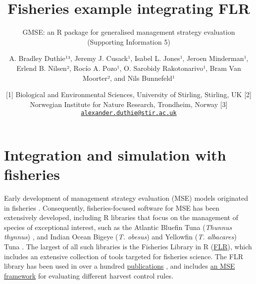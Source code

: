 \documentclass[]{article}
\title{Fisheries example integrating FLR}
\subtitle{GMSE: an R package for generalised management strategy evaluation
(Supporting Information 5)}
\author{A. Bradley Duthie¹³, Jeremy J. Cusack¹, Isabel L. Jones¹, Jeroen
Minderman¹, Erlend B. Nilsen², Rocío A. Pozo¹, O. Sarobidy
Rakotonarivo¹, Bram Van Moorter², and Nils Bunnefeld¹}
\date{{[}1{]} Biological and Environmental Sciences, University of Stirling,
Stirling, UK {[}2{]} Norwegian Institute for Nature Research, Trondheim,
Norway {[}3{]}
\href{mailto:alexander.duthie@stir.ac.uk}{\nolinkurl{alexander.duthie@stir.ac.uk}}}
\begin{document}
\maketitle

\section{Integration and simulation with
fisheries}\label{integration-and-simulation-with-fisheries}

Early development of management strategy evaluation (MSE) models
originated in fisheries \citep{Polacheck1999, Smith1999, Sainsbury2000}.
Consequently, fisheries-focused software for MSE has been extensively
developed, including R libraries that focus on the management of species
of exceptional interest, such as the Atlantic Bluefin Tuna
(\emph{Thunnus thynnus})
\citep[\href{https://github.com/ICCAT/abft-mse/tree/master/R_package/ABTMSE}{ABFTMSE};][]{Carruthers2018, Carruthers2018a},
and Indian Ocean Bigeye (\emph{T. obesus}) and Yellowfin (\emph{T.
albacares}) Tuna
\citep[\href{https://github.com/pjumppanen/MSE-IO-BET-YFT}{MSE-IO-BET-YFT};][]{Kolody2016}.
The largest of all such libraries is the Fisheries Library in R
(\href{http://www.flr-project.org/}{FLR}), which includes an extensive
collection of tools targeted for fisheries science. The FLR library has
been used in over a hundred
\href{http://www.flr-project.org/\#publications}{publications}
\citep[recent publications
include][]{Jardim2018, Mackinson2018, Utizi2018}, and includes
\href{http://www.flr-project.org/doc/An_introduction_to_MSE_using_FLR.html}{an
MSE framework} for evaluating different harvest control rules.
\end{document}
